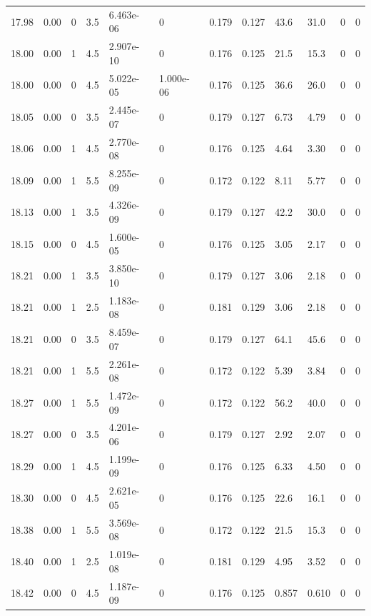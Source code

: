 \documentclass[preview]{standalone}
\begin{document}
{{{{{{{{{{{{{{{{{\begin{tabular}{L{1.2cm}C{1.2cm} C{0.3cm}C{0.5cm} C{1.4cm}C{1.4cm} C{1.4cm}C{1.4cm} C{1.6cm}C{1.6cm} C{1.6cm}C{1.6cm}}
  17.98  &  0.00  & 0     & 3.5 &  6.463e-06  & 0  &  0.179&   0.127& 43.6 & 31.0   &  0 & 0  \\ 
  18.00  &  0.00  & 1     & 4.5 &  2.907e-10  & 0  &  0.176&   0.125& 21.5 & 15.3   &  0 & 0  \\ 
  18.00  &  0.00  & 0     & 4.5 &  5.022e-05  & 1.000e-06  &  0.176&   0.125& 36.6 & 26.0   &  0 & 0  \\ 
  18.05  &  0.00  & 0     & 3.5 &  2.445e-07  & 0  &  0.179&   0.127& 6.73 & 4.79   &  0 & 0  \\ 
  18.06  &  0.00  & 1     & 4.5 &  2.770e-08  & 0  &  0.176&   0.125& 4.64 & 3.30   &  0 & 0  \\ 
  18.09  &  0.00  & 1     & 5.5 &  8.255e-09  & 0  &  0.172&   0.122& 8.11 & 5.77   &  0 & 0  \\ 
  18.13  &  0.00  & 1     & 3.5 &  4.326e-09  & 0  &  0.179&   0.127& 42.2 & 30.0   &  0 & 0  \\ 
  18.15  &  0.00  & 0     & 4.5 &  1.600e-05  & 0  &  0.176&   0.125& 3.05 & 2.17   &  0 & 0  \\ 
  18.21  &  0.00  & 1     & 3.5 &  3.850e-10  & 0  &  0.179&   0.127& 3.06 & 2.18   &  0 & 0  \\ 
  18.21  &  0.00  & 1     & 2.5 &  1.183e-08  & 0  &  0.181&   0.129& 3.06 & 2.18   &  0 & 0  \\ 
  18.21  &  0.00  & 0     & 3.5 &  8.459e-07  & 0  &  0.179&   0.127& 64.1 & 45.6   &  0 & 0  \\ 
  18.21  &  0.00  & 1     & 5.5 &  2.261e-08  & 0  &  0.172&   0.122& 5.39 & 3.84   &  0 & 0  \\ 
  18.27  &  0.00  & 1     & 5.5 &  1.472e-09  & 0  &  0.172&   0.122& 56.2 & 40.0   &  0 & 0  \\ 
  18.27  &  0.00  & 0     & 3.5 &  4.201e-06  & 0  &  0.179&   0.127& 2.92 & 2.07   &  0 & 0  \\ 
  18.29  &  0.00  & 1     & 4.5 &  1.199e-09  & 0  &  0.176&   0.125& 6.33 & 4.50   &  0 & 0  \\ 
  18.30  &  0.00  & 0     & 4.5 &  2.621e-05  & 0  &  0.176&   0.125& 22.6 & 16.1   &  0 & 0  \\ 
  18.38  &  0.00  & 1     & 5.5 &  3.569e-08  & 0  &  0.172&   0.122& 21.5 & 15.3   &  0 & 0  \\ 
  18.40  &  0.00  & 1     & 2.5 &  1.019e-08  & 0  &  0.181&   0.129& 4.95 & 3.52   &  0 & 0  \\ 
  18.42  &  0.00  & 0     & 4.5 &  1.187e-09  & 0  &  0.176&   0.125& 0.857 & 0.610   &  0 & 0  \\ 

\end{tabular}}}}}}}}}}}}}}}}}}
\end{document}
